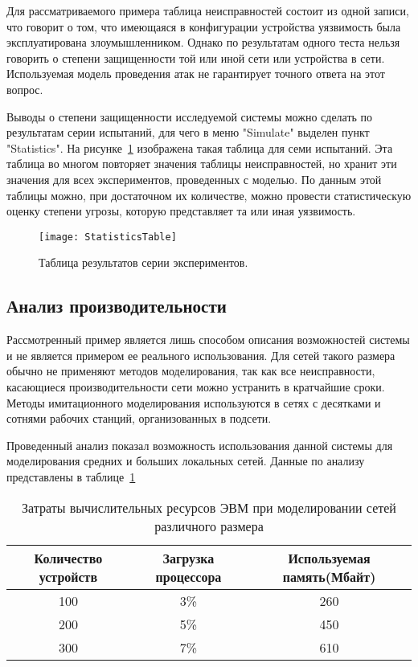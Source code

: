     Для рассматриваемого примера таблица неисправностей состоит из одной записи, что говорит о том, что имеющаяся в конфигурации устройства уязвимость была эксплуатирована злоумышленником. Однако по результатам одного теста нельзя говорить о степени защищенности той или иной сети или устройства в сети. Используемая модель проведения атак не гарантирует точного ответа на этот вопрос.

    Выводы о степени защищенности исследуемой системы можно сделать по результатам серии испытаний, для чего в меню "Simulate" выделен пункт "Statistics". На рисунке~\ref{Pic16} изображена такая таблица для семи испытаний. Эта таблица во многом повторяет значения таблицы неисправностей, но хранит эти значения для всех экспериментов, проведенных с моделью. По данным этой таблицы можно, при достаточном их количестве, можно провести статистическую оценку степени угрозы, которую представляет та или иная уязвимость.

    \begin{figure}[h!]\center
        \texttt{[image: StatisticsTable]}
        \caption{Таблица результатов серии экспериментов. } \label{Pic16}
    \end{figure}

    \subsection{Анализ производительности}

    Рассмотренный пример является лишь способом описания возможностей системы и не является примером ее реального использования. Для сетей такого размера обычно не применяют методов моделирования, так как все неисправности, касающиеся производительности сети можно устранить в кратчайшие сроки. Методы имитационного моделирования используются в сетях с десятками и сотнями рабочих станций, организованных в подсети.

    Проведенный анализ показал возможность использования данной системы для моделирования средних и больших локальных сетей. Данные по анализу представлены в таблице~\ref{table1}
    \begin{table}[h!]
        \caption{Затраты вычислительных ресурсов ЭВМ при моделировании сетей различного размера}\label{table1}
        \begin{tabular}{|c|c|c|}

            \hline
            Количество устройств & Загрузка процессора & Используемая память(Мбайт) \\ \hline
            100 & 3\% & 260 \\ \hline
            200 & 5\% & 450 \\ \hline
            300 & 7\% & 610 \\ \hline

        \end{tabular}
    \end{table}

